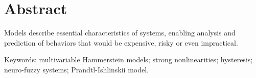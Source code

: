 \chapter*{Abstract}
\thispagestyle{empty}

\noindent Models describe essential characteristics of systems, enabling analysis and prediction of behaviors that would be expensive, risky or even impractical. 
\par
\noindent Keywords: multivariable Hammerstein models; strong nonlinearities; hysteresis; neuro-fuzzy systems; Prandtl-Ishlinskii model.